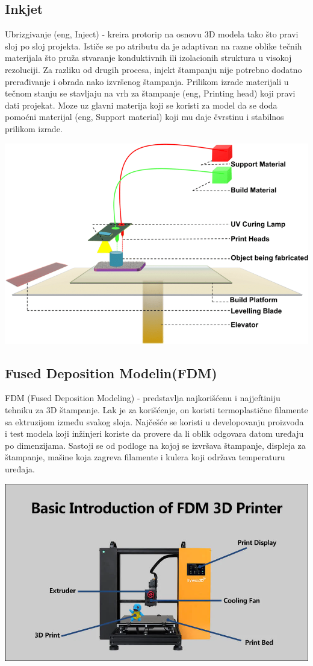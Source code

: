 \documentclass[a4paper]{article}
\begin{document}
{\subsection{Inkjet}
\label{subsec:podnaslov1}
Ubrizgivanje (eng, Inject) - kreira protorip na osnovu 3D modela tako što pravi sloj po sloj projekta.
\bigbreak Ističe se po atributu da je adaptivan na razne oblike tečnih materijala što pruža stvaranje konduktivnih ili izolacionih struktura u visokoj rezoluciji. 
\bigbreak Za razliku od drugih procesa, injekt štampanju nije potrebno dodatno prerađivanje i obrada nako izvršenog štampanja.
\bigbreak Prilikom izrade materijali u tečnom stanju se stavljaju na vrh za štampanje (eng, Printing head) koji pravi dati projekat.
\bigbreak Moze uz glavni materija koji se koristi za model da se doda pomoćni materijal (eng, Support material) koji mu daje čvrstinu i stabilnos prilikom izrade.
\begin{center}
\includegraphics[width=.5\textwidth ]{Tehnikeslike/Inject.png}
\end{center}

\subsection{Fused Deposition Modelin(FDM)}
\label{subsec:podnaslov2}
FDM (Fused Deposition Modeling) - predstavlja najkorišćenu i najjeftiniju tehniku za 3D štampanje. Lak je za korišćenje, on koristi termoplastične filamente sa ektruzijom između svakog sloja.
\bigbreak Najčešće se koristi u developovanju proizvoda  i test modela koji inžinjeri koriste da provere da li oblik odgovara datom uređaju po dimenzijama. 
\bigbreak Sastoji se od podloge na kojoj se izvršava štampanje, displeja za štampanje, mašine koja zagreva filamente i kulera koji održava temperaturu uređaja.

\begin{center}
\includegraphics[width=.5\textwidth ]{Tehnikeslike/FDM.PNG}
\end{center}

}
\end{document}
